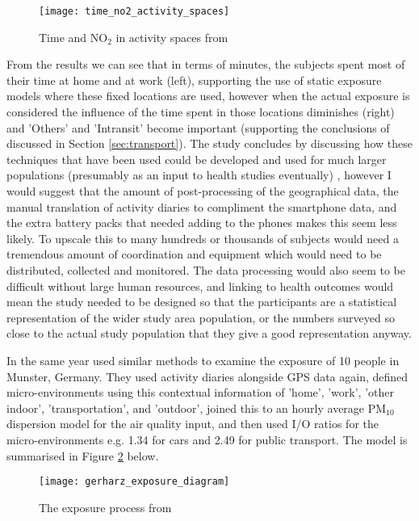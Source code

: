 \begin{figure}[H]
\centering
\texttt{[image: time\_no2\_activity\_spaces]}
\caption{Time and NO$_{2}$ in activity spaces from \cite{DeNazelle2013}}
\label{fig:time_no2_activity_spaces}
\end{figure}

From the results we can see that in terms of minutes, the subjects spent most of their time at home and at work (left), supporting the use of static exposure models where these fixed locations are used, however when the actual exposure is considered the influence of the time spent in those locations diminishes (right) and 'Others' and 'Intransit' become important (supporting the conclusions of \cite{Dons2011} discussed in Section \ref{sec:transport}). The study concludes by discussing how these techniques that have been used could be developed and used for much larger populations (presumably as an input to health studies eventually) , however I would suggest that the amount of post-processing of the geographical data, the manual translation of activity diaries to compliment the smartphone data, and the extra battery packs that needed adding to the phones makes this seem less likely. To upscale this to many hundreds or thousands of subjects would need a tremendous amount of coordination and equipment which would need to be distributed, collected and monitored. The data processing would also seem to be difficult without large human resources, and linking to health outcomes would mean the study needed to be designed so that the participants are a statistical representation of the wider study area population, or the numbers surveyed so close to the actual study population that they give a good representation anyway. 

In the same year \cite{Gerharz2013} used similar methods to examine the exposure of 10 people in Munster, Germany. They used activity diaries alongside GPS data again, defined micro-environments using this contextual information of 'home', 'work', 'other indoor', 'transportation', and 'outdoor', joined this to an hourly average PM$_{10}$ dispersion model for the air quality input, and then used I/O ratios for the micro-environments e.g. 1.34 for cars and 2.49 for public transport. The model is summarised in Figure \ref{fig:gerharz_exposure_diagram} below.

\begin{figure}[H]
\centering
\texttt{[image: gerharz\_exposure\_diagram]}
\caption{The exposure process from \cite{Gerharz2013} }
\label{fig:gerharz_exposure_diagram}
\end{figure}

